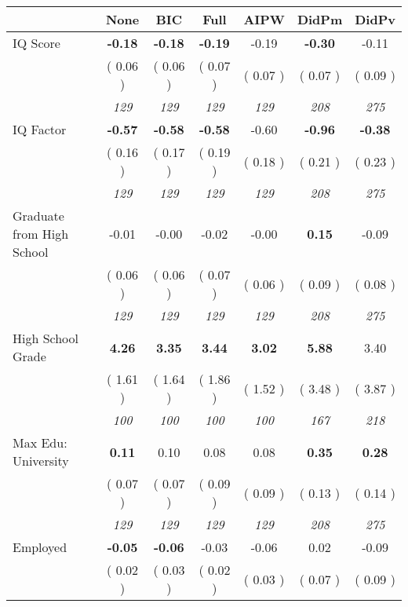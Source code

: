 \begin{tabular}{l c c c c c c}
\toprule
 & None & BIC & Full & AIPW & DidPm & DidPv \\
\midrule
IQ Score & \textbf{     -0.18 } & \textbf{     -0.18 } & \textbf{     -0.19 } &     -0.19 & \textbf{     -0.30 } &     -0.11 \\
& (     0.06 ) & (     0.06 ) & (     0.07 ) & (     0.07 ) & (     0.07 ) & (     0.09 ) \\
& \textit{ 129 } & \textit{ 129 } & \textit{ 129 } & \textit{ 129 } & \textit{ 208 } & \textit{ 275 } \\
IQ Factor & \textbf{     -0.57 } & \textbf{     -0.58 } & \textbf{     -0.58 } &     -0.60 & \textbf{     -0.96 } & \textbf{     -0.38 } \\
& (     0.16 ) & (     0.17 ) & (     0.19 ) & (     0.18 ) & (     0.21 ) & (     0.23 ) \\
& \textit{ 129 } & \textit{ 129 } & \textit{ 129 } & \textit{ 129 } & \textit{ 208 } & \textit{ 275 } \\
Graduate from High School &     -0.01 &     -0.00 &     -0.02 &     -0.00 & \textbf{      0.15 } &     -0.09 \\
& (     0.06 ) & (     0.06 ) & (     0.07 ) & (     0.06 ) & (     0.09 ) & (     0.08 ) \\
& \textit{ 129 } & \textit{ 129 } & \textit{ 129 } & \textit{ 129 } & \textit{ 208 } & \textit{ 275 } \\
High School Grade & \textbf{      4.26 } & \textbf{      3.35 } & \textbf{      3.44 } & \textbf{     3.02} & \textbf{      5.88 } &      3.40 \\
& (     1.61 ) & (     1.64 ) & (     1.86 ) & (     1.52 ) & (     3.48 ) & (     3.87 ) \\
& \textit{ 100 } & \textit{ 100 } & \textit{ 100 } & \textit{ 100 } & \textit{ 167 } & \textit{ 218 } \\
Max Edu: University & \textbf{      0.11 } &      0.10 &      0.08 &      0.08 & \textbf{      0.35 } & \textbf{      0.28 } \\
& (     0.07 ) & (     0.07 ) & (     0.09 ) & (     0.09 ) & (     0.13 ) & (     0.14 ) \\
& \textit{ 129 } & \textit{ 129 } & \textit{ 129 } & \textit{ 129 } & \textit{ 208 } & \textit{ 275 } \\
Employed & \textbf{     -0.05 } & \textbf{     -0.06 } &     -0.03 &     -0.06 &      0.02 &     -0.09 \\
& (     0.02 ) & (     0.03 ) & (     0.02 ) & (     0.03 ) & (     0.07 ) & (     0.09 ) \\

\end{tabular}
